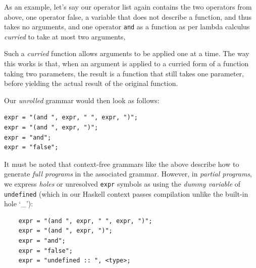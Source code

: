 \documentclass{article}
\begin{document}

As an example, let's say our operator list again contains the two operators from above,
one operator false, a variable that does not describe a function, and thus takes no arguments,
and one operator \verb|and| as a function as per lambda calculus \emph{curried} to take at most two arguments,

Such a \emph{curried} function allows arguments to be applied one at a time.
The way this works is that, when an argument is applied to a curried form of a function taking two parameters,
the result is a function that still takes one parameter, before yielding the actual result of the original function.

Our \emph{unrolled} grammar would then look as follows:%
    


\begin{verbatim}
expr = "(and ", expr, " ", expr, ")";
expr = "(and ", expr, ")";
expr = "and";
expr = "false";
\end{verbatim}

It must be noted that context-free grammars like the above
describe how to generate \emph{full programs} in the associated grammar.
However,
in \emph{partial programs},
we express \emph{holes} or unresolved \verb|expr| symbols as
using the \emph{dummy variable} of \verb|undefined|
(which in our Haskell context passes compilation unlike the built-in hole `\_'):

\begin{verbatim}
    expr = "(and ", expr, " ", expr, ")";
    expr = "(and ", expr, ")";
    expr = "and";
    expr = "false";
    expr = "undefined :: ", <type>;
\end{verbatim}
\end{document}
